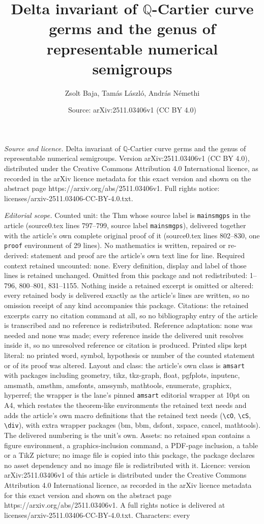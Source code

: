 \documentclass[10pt,a4paper]{amsart}
\title[Delta invariant of $\mathbb{Q}$-Cartier curve germs and the ]{Delta invariant of $\mathbb{Q}$-Cartier curve germs and the genus of representable numerical semigroups}
\author{Zsolt Baja, Tam\'as L\'aszl\'o, Andr\'as N\'emethi}
\date{Source: arXiv:2511.03406v1 (CC BY 4.0)}
\begin{document}
\maketitle

\noindent\emph{Source and licence.} Delta invariant of $\mathbb{Q}$-Cartier curve germs and the genus of representable numerical semigroups. Version arXiv:2511.03406v1 (CC BY 4.0), distributed under the Creative Commons Attribution 4.0 International licence, as recorded in the arXiv licence metadata for this exact version and shown on the abstract page https://arxiv.org/abs/2511.03406v1. Full rights notice: licenses/arxiv-2511.03406-CC-BY-4.0.txt.\par\smallskip

\noindent\textit{Editorial scope.} Counted unit: the Thm whose source label is \texttt{mainsmgps} in the article (source0.tex lines 797--799, source label \texttt{mainsmgps}), delivered together with the article's own complete original proof of it (source0.tex lines 802--830, one \texttt{proof} environment of 29 lines). No mathematics is written, repaired or re-derived: statement and proof are the article's own text line for line. Required context retained uncounted: none. Every definition, display and label of those lines is retained unchanged. Omitted from this package and not redistributed: 1--796, 800--801, 831--1155. Nothing inside a retained excerpt is omitted or altered: every retained body is delivered exactly as the article's lines are written, so no omission receipt of any kind accompanies this package. Citations: the retained excerpts carry no citation command at all, so no bibliography entry of the article is transcribed and no reference is redistributed. Reference adaptation: none was needed and none was made; every reference inside the delivered unit resolves inside it, so no unresolved reference or citation is produced. Printed slips kept literal: no printed word, symbol, hypothesis or number of the counted statement or of its proof was altered. Layout and class: the article's own class is \texttt{amsart} with packages including geometry, tikz, tkz-graph, float, pgfplots, inputenc, amsmath, amsthm, amsfonts, amssymb, mathtools, enumerate, graphicx, hyperref; the wrapper is the lane's pinned \texttt{amsart} editorial wrapper at 10pt on A4, which restates the theorem-like environments the retained text needs and adds the article's own macro definitions that the retained text needs (\texttt{\textbackslash cO}, \texttt{\textbackslash cS}, \texttt{\textbackslash div}), with extra wrapper packages (bm, bbm, dsfont, xspace, cancel, mathtools). The delivered numbering is the unit's own. Assets: no retained span contains a figure environment, a graphics-inclusion command, a PDF-page inclusion, a table or a TikZ picture; no image file is copied into this package, the package declares no asset dependency and no image file is redistributed with it. Licence: version arXiv:2511.03406v1 of this article is distributed under the Creative Commons Attribution 4.0 International licence, as recorded in the arXiv licence metadata for this exact version and shown on the abstract page https://arxiv.org/abs/2511.03406v1. A full rights notice is delivered at licenses/arxiv-2511.03406-CC-BY-4.0.txt. Characters: every 
\end{document}
